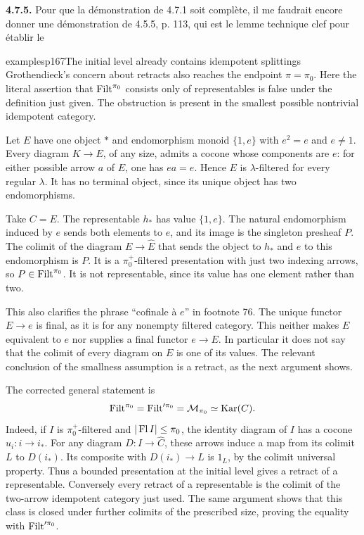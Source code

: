 
\textbf{4.7.5.} Pour que la démonstration de 4.7.1 soit complète, il me faudrait encore donner une démonstration de 4.5.5, p. 113, qui est le lemme technique clef pour établir le

\begin{dcomment}{examples}{p167}{The initial level already contains idempotent splittings}
Grothendieck's concern about retracts also reaches the endpoint $\pi=\pi_0$. Here the literal assertion that $\operatorname{Filt}^{\pi_0}$ consists only of representables is false under the definition just given. The obstruction is present in the smallest possible nontrivial idempotent category.

Let $E$ have one object $*$ and endomorphism monoid $\{1,e\}$ with $e^2=e$ and $e\neq1$. Every diagram $K\to E$, of any size, admits a cocone whose components are $e$: for either possible arrow $a$ of $E$, one has $ea=e$. Hence $E$ is $\lambda$-filtered for every regular $\lambda$. It has no terminal object, since its unique object has two endomorphisms.

Take $C=E$. The representable $h_*$ has value $\{1,e\}$. The natural endomorphism induced by $e$ sends both elements to $e$, and its image is the singleton presheaf $P$. The colimit of the diagram $E\to\widehat E$ that sends the object to $h_*$ and $e$ to this endomorphism is $P$. It is a $\pi_0^+$-filtered presentation with just two indexing arrows, so $P\in\operatorname{Filt}^{\pi_0}$. It is not representable, since its value has one element rather than two.

This also clarifies the phrase ``cofinale \`a $e$'' in footnote 76. The unique functor $E\to e$ is final, as it is for any nonempty filtered category. This neither makes $E$ equivalent to $e$ nor supplies a final functor $e\to E$. In particular it does not say that the colimit of every diagram on $E$ is one of its values. The relevant conclusion of the smallness assumption is a retract, as the next argument shows.

The corrected general statement is
\[
 \operatorname{Filt}^{\pi_0}=\operatorname{Filt}'^{\pi_0}
 =\mathcal M_{\pi_0}\simeq\operatorname{Kar}(C).
\]
Indeed, if $I$ is $\pi_0^+$-filtered and $|\operatorname{Fl} I|\leq\pi_0$, the identity diagram of $I$ has a cocone $u_i:i\to i_*$. For any diagram $D:I\to\widehat C$, these arrows induce a map from its colimit $L$ to $D(i_*)$. Its composite with $D(i_*)\to L$ is $1_L$, by the colimit universal property. Thus a bounded presentation at the initial level gives a retract of a representable. Conversely every retract of a representable is the colimit of the two-arrow idempotent category just used. The same argument shows that this class is closed under further colimits of the prescribed size, proving the equality with $\operatorname{Filt}'^{\pi_0}$.


\end{dcomment}

